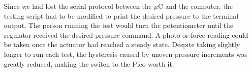 Since we had lost the serial protocol between the $\mu$C and the computer, the testing script had to be modified to print the desired pressure to the terminal output. The person running the test would turn the potentiometer until the regulator received the desired pressure command. A photo or force reading could be taken once the actuator had reached a steady state. Despite taking slightly longer to run each test, the hysteresis caused by uneven pressure increments was greatly reduced, making the switch to the Pico worth it. 
